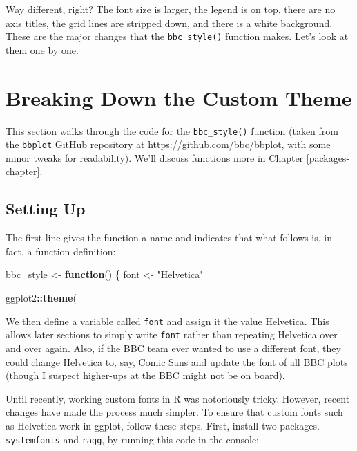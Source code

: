 \documentclass[
]{book}
\newenvironment{Shaded}{\begin{snugshade}}{\end{snugshade}}
\newcommand{\ControlFlowTok}[1]{\textcolor[rgb]{0.13,0.29,0.53}{\textbf{#1}}}
\newcommand{\FunctionTok}[1]{\textcolor[rgb]{0.13,0.29,0.53}{\textbf{#1}}}
\newcommand{\NormalTok}[1]{#1}
\newcommand{\OtherTok}[1]{\textcolor[rgb]{0.56,0.35,0.01}{#1}}
\newcommand{\SpecialCharTok}[1]{\textcolor[rgb]{0.81,0.36,0.00}{\textbf{#1}}}
\newcommand{\StringTok}[1]{\textcolor[rgb]{0.31,0.60,0.02}{#1}}
\begin{document}
Way different, right? The font size is larger, the legend is on top, there are no axis titles, the grid lines are stripped down, and there is a white background. These are the major changes that the \texttt{bbc\_style()} function makes. Let's look at them one by one.

\hypertarget{breaking-down-the-custom-theme}{%
\section*{Breaking Down the Custom Theme}\label{breaking-down-the-custom-theme}}

This section walks through the code for the \texttt{bbc\_style()} function (taken from the \texttt{bbplot} GitHub repository at \url{https://github.com/bbc/bbplot}, with some minor tweaks for readability). We'll discuss functions more in Chapter \ref{packages-chapter}.

\hypertarget{setting-up-1}{%
\subsection*{Setting Up}\label{setting-up-1}}

The first line gives the function a name and indicates that what follows is, in fact, a function definition:

\begin{Shaded}
\begin{Highlighting}[]
\NormalTok{bbc\_style }\OtherTok{\textless{}{-}} \ControlFlowTok{function}\NormalTok{() \{}
\NormalTok{  font }\OtherTok{\textless{}{-}} \StringTok{"Helvetica"}
  
\NormalTok{  ggplot2}\SpecialCharTok{::}\FunctionTok{theme}\NormalTok{(}
\end{Highlighting}
\end{Shaded}

We then define a variable called \texttt{font} and assign it the value Helvetica. This allows later sections to simply write \texttt{font} rather than repeating Helvetica over and over again. Also, if the BBC team ever wanted to use a different font, they could change Helvetica to, say, Comic Sans and update the font of all BBC plots (though I suspect higher-ups at the BBC might not be on board).

Until recently, working custom fonts in R was notoriously tricky. However, recent changes have made the process much simpler. To ensure that custom fonts such as Helvetica work in ggplot, follow these steps. First, install two packages. \texttt{systemfonts} and \texttt{ragg}, by running this code in the console:
\end{document}

